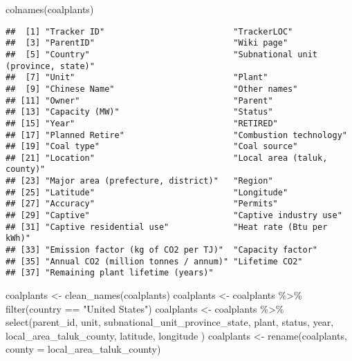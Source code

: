 \documentclass[
]{article}
\newenvironment{Shaded}{\begin{snugshade}}{\end{snugshade}}
\newcommand{\AttributeTok}[1]{\textcolor[rgb]{0.77,0.63,0.00}{#1}}
\newcommand{\FunctionTok}[1]{\textcolor[rgb]{0.00,0.00,0.00}{#1}}
\newcommand{\NormalTok}[1]{#1}
\newcommand{\OtherTok}[1]{\textcolor[rgb]{0.56,0.35,0.01}{#1}}
\newcommand{\SpecialCharTok}[1]{\textcolor[rgb]{0.00,0.00,0.00}{#1}}
\newcommand{\StringTok}[1]{\textcolor[rgb]{0.31,0.60,0.02}{#1}}
\begin{document}
\begin{Shaded}
\begin{Highlighting}[]
\FunctionTok{colnames}\NormalTok{(coalplants)}
\end{Highlighting}
\end{Shaded}

\begin{verbatim}
##  [1] "Tracker ID"                          "TrackerLOC"                         
##  [3] "ParentID"                            "Wiki page"                          
##  [5] "Country"                             "Subnational unit (province, state)" 
##  [7] "Unit"                                "Plant"                              
##  [9] "Chinese Name"                        "Other names"                        
## [11] "Owner"                               "Parent"                             
## [13] "Capacity (MW)"                       "Status"                             
## [15] "Year"                                "RETIRED"                            
## [17] "Planned Retire"                      "Combustion technology"              
## [19] "Coal type"                           "Coal source"                        
## [21] "Location"                            "Local area (taluk, county)"         
## [23] "Major area (prefecture, district)"   "Region"                             
## [25] "Latitude"                            "Longitude"                          
## [27] "Accuracy"                            "Permits"                            
## [29] "Captive"                             "Captive industry use"               
## [31] "Captive residential use"             "Heat rate (Btu per kWh)"            
## [33] "Emission factor (kg of CO2 per TJ)"  "Capacity factor"                    
## [35] "Annual CO2 (million tonnes / annum)" "Lifetime CO2"                       
## [37] "Remaining plant lifetime (years)"
\end{verbatim}

\begin{Shaded}
\begin{Highlighting}[]
\NormalTok{coalplants }\OtherTok{\textless{}{-}} \FunctionTok{clean\_names}\NormalTok{(coalplants)}
\NormalTok{coalplants }\OtherTok{\textless{}{-}}\NormalTok{ coalplants }\SpecialCharTok{\%\textgreater{}\%} \FunctionTok{filter}\NormalTok{(country }\SpecialCharTok{==} \StringTok{"United States"}\NormalTok{)}
\NormalTok{coalplants }\OtherTok{\textless{}{-}}\NormalTok{ coalplants }\SpecialCharTok{\%\textgreater{}\%} \FunctionTok{select}\NormalTok{(parent\_id, unit, subnational\_unit\_province\_state, plant, status, year, local\_area\_taluk\_county, latitude, longitude )}
\NormalTok{coalplants }\OtherTok{\textless{}{-}} \FunctionTok{rename}\NormalTok{(coalplants, }\AttributeTok{county =}\NormalTok{ local\_area\_taluk\_county)}
\end{Highlighting}
\end{Shaded}
\end{document}
